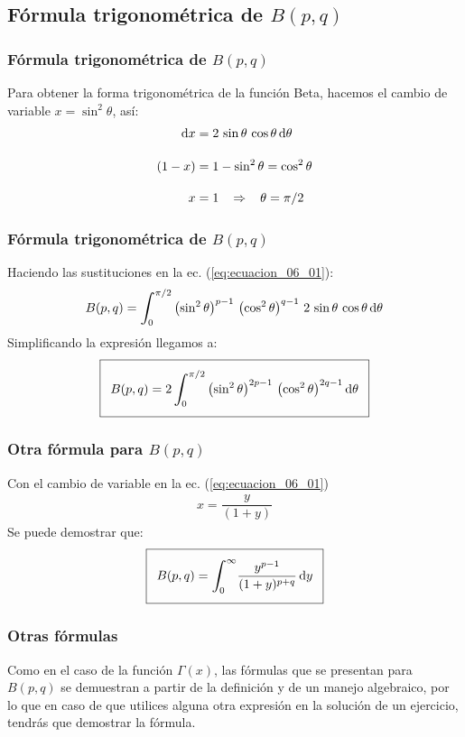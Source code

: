 \documentclass[12pt]{beamer}
\begin{document}
\subsection{Fórmula trigonométrica de \texorpdfstring{$B (p,q)$}{B (p, q)}}

\begin{frame}
\frametitle{Fórmula trigonométrica de $B (p,q)$}
Para obtener la forma trigonométrica de la función Beta, hacemos el cambio de variable $x = \sin^{2} \theta$, así:
\pause
\begin{align*}
\dd{x} &= 2 \, \sin \theta \, \cos \theta \dd{\theta} \\[1em]
(1 - x) &= 1 - \sin^{2} \theta = \cos^{2} \theta \\[1em]
x &= 1 \hspace{0.3cm} \Rightarrow \hspace{0.3cm} \theta = \pi/2
\end{align*}
\end{frame}
\begin{frame}
\frametitle{Fórmula trigonométrica de $B (p, q)$}
Haciendo las sustituciones en la ec. (\ref{eq:ecuacion_06_01}):
\pause
{\fontsize{12}{12}\selectfont
\begin{align}
B(p, q) = \scaleint{6ex}_{\bs 0}^{\pi/2} \left( \sin^{2} \theta \right)^{p-1} \, \left( \cos^{2} \theta \right)^{q-1} \, 2 \, \sin \theta \, \cos \theta \dd{\theta}
\end{align}}
\pause
Simplificando la expresión llegamos a:
{\fontsize{12}{12}\selectfont
\begin{align}
\addtolength{\fboxsep}{5pt}\boxed{B(p, q) = 2 \, \scaleint{6ex}_{\bs 0}^{\pi/2} \left( \sin^{2} \theta \right)^{2p-1} \, \left( \cos^{2} \theta \right)^{2q-1} \dd{\theta}}
\label{eq:ecuacion_06_04}
\end{align}}
\end{frame}
\begin{frame}
\frametitle{Otra fórmula para $B(p, q)$}
Con el cambio de variable en la ec. (\ref{eq:ecuacion_06_01})
\begin{align*}
x = \dfrac{y}{(1 + y)}
\end{align*}
\pause
Se puede demostrar que:
\begin{align}
\addtolength{\fboxsep}{5pt}\boxed{B(p, q) = \scaleint{6ex}_{\bs 0}^{\infty} \dfrac{y^{p-1}}{(1 + y)^{p+q}} \dd{y}}
\label{eq:ecuacion_06_05}
\end{align}   
\end{frame}
\begin{frame}
\frametitle{Otras fórmulas}
Como en el caso de la función $\Gamma (x)$, las fórmulas que se presentan para $B(p, q)$ se demuestran a partir de la definición y de un manejo algebraico, \pause por lo que en caso de que utilices alguna otra expresión en la solución de un ejercicio, tendrás que demostrar la fórmula.
\end{frame}
\end{document}
